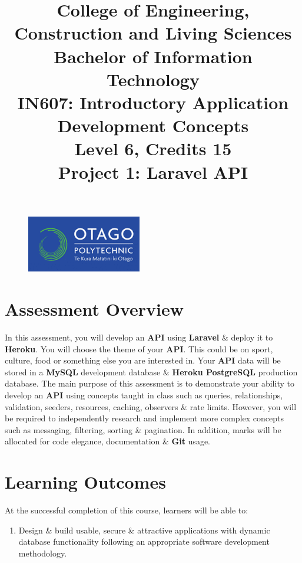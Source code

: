 \documentclass{article}
\author{}
\begin{document}
\begin{figure}
	\centering
	\includegraphics[width=50mm]{../img/logo.png}
\end{figure}

\title{College of Engineering, Construction and Living Sciences\\Bachelor of Information Technology\\IN607: Introductory Application Development Concepts\\Level 6, Credits 15\\\textbf{Project 1: Laravel API}}
\date{}
\maketitle

\section*{Assessment Overview}
In this assessment, you will develop an \textbf{API} using \textbf{Laravel} \& deploy it to \textbf{Heroku}. You will choose the theme of your \textbf{API}. This could be on sport, culture, food or something else you are interested in. Your \textbf{API} data will be stored in a \textbf{MySQL} development database \& \textbf{Heroku PostgreSQL} production database. The main purpose of this assessment is to demonstrate your ability to develop an \textbf{API} using concepts taught in class such as queries, relationships, validation, seeders, resources, caching, observers \& rate limits. However, you will be required to independently research and implement more complex concepts such as messaging, filtering, sorting \& pagination. In addition, marks will be allocated for code elegance, documentation \& \textbf{Git} usage. 

\section*{Learning Outcomes}
At the successful completion of this course, learners will be able to:
\begin{enumerate}
	\item Design \& build usable, secure \& attractive applications with dynamic database functionality following an appropriate software development methodology.
\end{enumerate}
\end{document}
